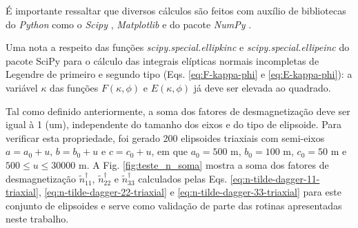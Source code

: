 É importante ressaltar que diversos cálculos são feitos com auxílio de bibliotecas do \textit{Python} como o \textit{Scipy} \citet{scipy}, \textit{Matplotlib} \citet{matplotlib} e do pacote \textit{NumPy} \citet{numpy}.

Uma nota a respeito das funções \textit{scipy.special.ellipkinc} e \textit{scipy.special.ellipeinc} do pacote SciPy para o cálculo das integrais elípticas normais incompletas de Legendre de primeiro e segundo tipo (Eqs. \ref{eq:F-kappa-phi} e \ref{eq:E-kappa-phi}): a variável $\kappa$ das funções $F(\kappa, \phi)$ e $E(\kappa, \phi)$ já deve ser elevada ao quadrado.

Tal como definido anteriormente, a soma dos fatores de desmagnetização deve ser igual à 1 (um), independente do tamanho dos eixos e do tipo de elipsoide. Para verificar esta propriedade, foi gerado 200 elipsoides triaxiais com semi-eixos $a = a_0 +u, \, b = b_0+u$ e $c = c_0+u$, em que $a_0=500$ m, $b_0=100$ m, $c_0=50$ m e $500  \le u \le 30000$ m. A Fig. \ref{fig:teste_n_soma} mostra a soma dos fatores de desmagnetização $\tilde{n}^{\dagger}_{11}$, $\tilde{n}^{\dagger}_{22}$ e $\tilde{n}^{\dagger}_{33}$ calculados pelas Eqs. \ref{eq:n-tilde-dagger-11-triaxial}, \ref{eq:n-tilde-dagger-22-triaxial} e \ref{eq:n-tilde-dagger-33-triaxial} para este conjunto de elipsoides e serve como validação de parte das rotinas apresentadas neste trabalho.


